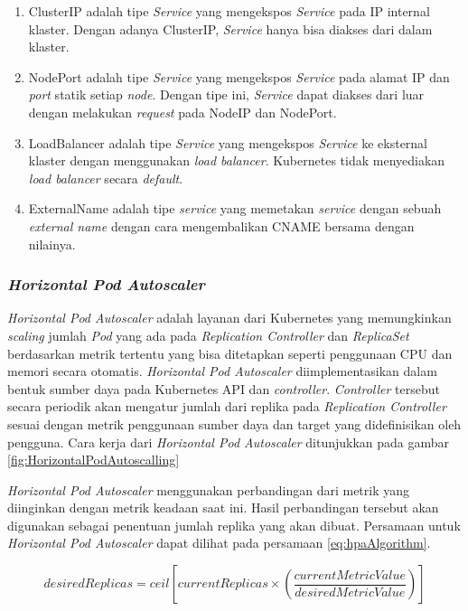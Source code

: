 \begin{enumerate}[itemsep=-0.2cm, topsep=-0.3cm]
  \item{ClusterIP adalah tipe \emph{Service} yang mengekspos \emph{Service}
      pada IP internal klaster. Dengan adanya ClusterIP, \emph{Service} hanya bisa
      diakses dari dalam klaster.
    }
  \item{NodePort adalah tipe \emph{Service} yang mengekspos \emph{Service}
      pada alamat IP dan \emph{port} statik setiap \emph{node}. Dengan tipe ini, \emph{Service}
      dapat diakses dari luar dengan melakukan \emph{request} pada NodeIP dan NodePort.
    }
  \item{LoadBalancer adalah tipe \emph{Service} yang mengekspos \emph{Service} ke eksternal klaster
      dengan menggunakan \emph{load balancer}. Kubernetes tidak menyediakan \emph{load balancer}
      secara \emph{default}.
    }
  \item{ExternalName adalah tipe \emph{service} yang memetakan \emph{service} dengan sebuah
      \emph{external name} dengan cara mengembalikan CNAME bersama dengan nilainya.
    }
\end{enumerate}

\subsubsection{\emph{Horizontal Pod Autoscaler}}

\emph{Horizontal Pod Autoscaler} adalah layanan dari Kubernetes yang memungkinkan
\emph{scaling} jumlah \emph{Pod} yang ada pada \emph{Replication Controller} dan \emph{ReplicaSet} berdasarkan
metrik tertentu yang bisa ditetapkan seperti penggunaan CPU dan memori secara otomatis.
\emph{Horizontal Pod Autoscaler} diimplementasikan dalam bentuk sumber daya pada Kubernetes
API dan \emph{controller}. \emph{Controller} tersebut secara periodik akan mengatur
jumlah dari replika pada \emph{Replication Controller} sesuai dengan metrik penggunaan
sumber daya dan target yang didefinisikan oleh pengguna.
Cara kerja dari \emph{Horizontal Pod Autoscaler} ditunjukkan pada gambar \ref{fig:HorizontalPodAutoscalling}

\emph{Horizontal Pod Autoscaler} menggunakan perbandingan dari metrik yang diinginkan
dengan metrik keadaan saat ini. Hasil perbandingan tersebut akan digunakan sebagai penentuan
jumlah replika yang akan dibuat. Persamaan untuk \emph{Horizontal Pod Autoscaler} dapat
dilihat pada persamaan \ref{eq:hpaAlgorithm}.

\begin{equation}
  desiredReplicas = ceil [ currentReplicas \times \left( \frac{currentMetricValue}{desiredMetricValue} \right) ]
  \label{eq:hpaAlgorithm}
\end{equation}

